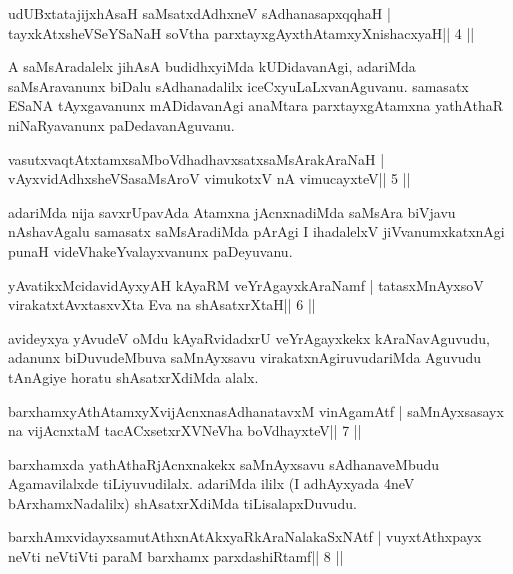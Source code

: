 \begin{shl}
udUBxtatajijxhAsaH saMsatxdAdhxneV sAdhanasapxqqhaH |
tayxkAtxsheVSeYSaNaH soV\s tha parxtayxgAyxthAtamxyXnishacxyaH\hfill || 4 ||
\end{shl}

\begin{artha}
A saMsAradalelx jihAsA budidhxyiMda kUDidavanAgi, adariMda
saMsAravanunx biDalu sAdhanadalilx iceCxyuLaLxvanAguvanu.
samasatx ESaNA tAyxgavanunx mADidavanAgi anaMtara parxtayxgAtamxna
yathAthaR niNaRyavanunx paDedavanAguvanu. 
\end{artha}

\begin{shl}
vasutxvaqtAtxtamxsaMboVdhadhavxsatxsaMsArakAraNaH |
vAyxvidAdhxsheVSasaMsAroV vimukotxV nA vimucayxteV\hfill || 5 ||
\end{shl}

\begin{artha}
adariMda nija savxrUpavAda Atamxna jAcnxnadiMda saMsAra biVjavu
nAshavAgalu samasatx saMsAradiMda pArAgi I ihadalelxV jiVvanumxkatxnAgi
punaH videVhakeYvalayxvanunx paDeyuvanu. 
\end{artha}

\begin{shl}
yAvatikxMcidavidAyxyAH kAyaRM veYrAgayxkAraNamf |
tatasxMnAyxsoV virakatxtAvxtasxvXta Eva na shAsatxrXtaH\hfill || 6 ||
\end{shl}

\begin{artha}
avideyxya yAvudeV oMdu kAyaRvidadxrU veYrAgayxkekx kAraNavAguvudu, adanunx biDuvudeMbuva saMnAyxsavu virakatxnAgiruvudariMda Aguvudu tAnAgiye horatu shAsatxrXdiMda alalx.
\end{artha}

\begin{shl}
barxhamxyAthAtamxyXvijAcnxnasAdhanatavxM vinA\s\s gamAtf |
saMnAyxsasayx na vijAcnxtaM tacACxsetxrXVNeVha boVdhayxteV\hfill || 7 ||
\end{shl}

\begin{artha}
barxhamxda yathAthaRjAcnxnakekx saMnAyxsavu sAdhanaveMbudu Agamavilalxde tiLiyuvudilalx. adariMda ililx (I adhAyxyada 4neV bArxhamxNadalilx) shAsatxrXdiMda tiLisalapxDuvudu.
\end{artha}


\begin{shl}
barxhAmxvidayxsamutAthxnAtAkxyaRkAraNalakaSxNAtf |
vuyxtAthxpayx neVti neVtiVti paraM barxhamx parxdashiRtamf\hfill || 8 ||
\end{shl}

